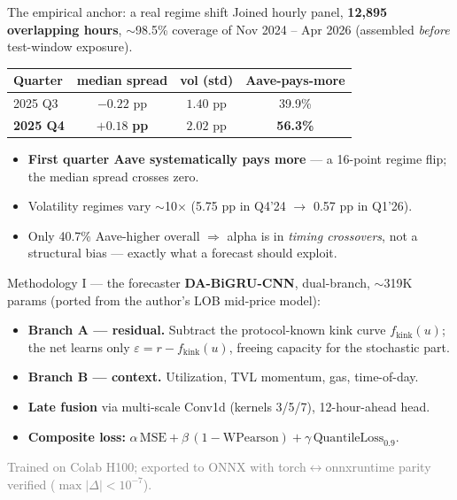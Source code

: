 \documentclass[aspectratio=169,11pt]{beamer}
\begin{document}
\begin{frame}{The empirical anchor: a real regime shift}
  Joined hourly panel, \textbf{12{,}895 overlapping hours}, $\sim$98.5\%
  coverage of Nov 2024 -- Apr 2026 (assembled \emph{before} test-window
  exposure).

  \medskip
  \begin{center}
  \begin{tabular}{lccc}
    \toprule
    Quarter & median spread & vol (std) & Aave-pays-more \\
    \midrule
    2025 Q3 & $-0.22$ pp & $1.40$ pp & 39.9\% \\
    \textbf{2025 Q4} & $\mathbf{+0.18}$ \textbf{pp} & $2.02$ pp & \textbf{56.3\%} \\
    \bottomrule
  \end{tabular}
  \end{center}

  \medskip
  \begin{itemize}
    \item \textbf{First quarter Aave systematically pays more} --- a 16-point
          regime flip; the median spread crosses zero.
    \item Volatility regimes vary $\sim$10$\times$ (5.75 pp in Q4'24
          $\to$ 0.57 pp in Q1'26).
    \item Only 40.7\% Aave-higher overall $\Rightarrow$ alpha is in
          \emph{timing crossovers}, not a structural bias --- exactly what a
          forecast should exploit.
  \end{itemize}
\end{frame}

\begin{frame}{Methodology I --- the forecaster}
  \textbf{DA-BiGRU-CNN}, dual-branch, $\sim$319K params (ported from the
  author's LOB mid-price model):

  \medskip
  \begin{itemize}
    \item \textbf{Branch A --- residual.} Subtract the protocol-known kink
          curve $f_{\text{kink}}(u)$; the net learns only
          $\varepsilon = r - f_{\text{kink}}(u)$, freeing capacity for the
          stochastic part.
    \item \textbf{Branch B --- context.} Utilization, TVL momentum, gas,
          time-of-day.
    \item \textbf{Late fusion} via multi-scale Conv1d (kernels 3/5/7),
          12-hour-ahead head.
    \item \textbf{Composite loss:}
          $\alpha\,\text{MSE} + \beta\,(1-\text{WPearson}) +
           \gamma\,\text{QuantileLoss}_{0.9}$.
  \end{itemize}

  \medskip
  \footnotesize\textcolor{gray}{Trained on Colab H100; exported to ONNX with
  torch$\leftrightarrow$onnxruntime parity verified ($\max|\Delta|\!<\!10^{-7}$).}
\end{frame}
\end{document}
